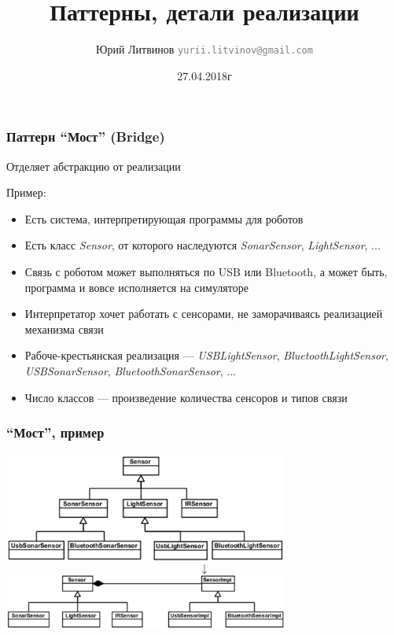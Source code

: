 \documentclass[xetex,mathserif,serif]{beamer}
\title{Паттерны, детали реализации}
\author[Юрий Литвинов]{Юрий Литвинов \newline \textcolor{gray}{\small\texttt{yurii.litvinov@gmail.com}}}
\date{27.04.2018г}
\begin{document}
	
	\frame{\titlepage}

	\begin{frame}
		\frametitle{Паттерн ``Мост'' (Bridge)}
		Отделяет абстракцию от реализации

		Пример:
		\begin{itemize}
			\item Есть система, интерпретирующая программы для роботов
			\item Есть класс \textit{Sensor}, от которого наследуются \textit{SonarSensor}, \textit{LightSensor}, ...
			\item Связь с роботом может выполняться по USB или Bluetooth, а может быть, программа и вовсе исполняется на симуляторе
			\item Интерпретатор хочет работать с сенсорами, не заморачиваясь реализацией механизма связи
			\item Рабоче-крестьянская реализация --- \textit{USBLightSensor}, \textit{BluetoothLightSensor}, \textit{USBSonarSensor}, \textit{BluetoothSonarSensor}, ...
			\item Число классов --- произведение количества сенсоров и типов связи
		\end{itemize}
	\end{frame}

	\begin{frame}
		\frametitle{``Мост'', пример}
		\begin{center}
			\includegraphics[width=0.7\textwidth]{noBridge.png}
			\Huge{$$\downarrow$$}
			\includegraphics[width=0.7\textwidth]{bridge.png}
		\end{center}
	\end{frame}
\end{document}
